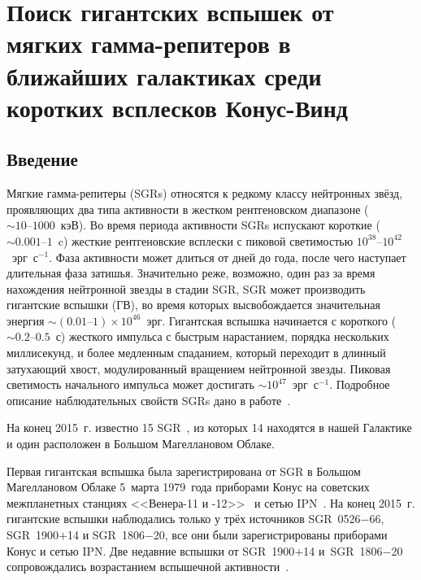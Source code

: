 \chapter{Поиск гигантских вспышек от мягких гамма-репитеров в ближайших галактиках 
         среди коротких всплесков Конус-Винд} \label{SGR_GF_search}

\section{Введение}
Мягкие гамма-репитеры (SGRs) относятся к редкому классу нейтронных звёзд, проявляющих 
два типа активности в жестком рентгеновском диапазоне ($\sim 10\textrm{--}1000$~кэВ). 
Во время периода активности SGRs испускают короткие ($\sim0.001\textrm{--}1$~c) жесткие рентгеновские всплески 
с пиковой светимостью $10^{38}\textrm{--}10^{42}$~эрг~с$^{-1}$. Фаза активности может длиться 
от дней до года, после чего наступает длительная фаза затишья. Значительно реже, 
возможно, один раз за время нахождения нейтронной звезды в стадии SGR, SGR может 
производить гигантские вспышки (ГВ), во время которых высвобождается значительная 
энергия $\sim(0.01\textrm{--}1)\times 10^{46}$~эрг. Гигантская вспышка начинается 
с короткого ($\sim 0.2\textrm{--}0.5$~с) жесткого импульса с быстрым нарастанием, 
порядка нескольких миллисекунд, и более медленным спаданием, который переходит 
в длинный затухающий хвост, модулированный вращением нейтронной звезды. 
Пиковая светимость начального импульса может достигать $\sim 10^{47}$~эрг~с$^{-1}$.
Подробное описание наблюдательных свойств SGRs дано в работе~\citep{Mereghetti2013}.

На конец 2015~г. известно 15 SGR~\citep{Olausen_Kaspi2014}, из которых 14 
находятся в нашей Галактике и один расположен в Большом Магеллановом Облаке. 

Первая гигантская вспышка была зарегистрирована от SGR в Большом Магеллановом Облаке 
5~марта 1979~года приборами Конус на советских межпланетных станциях 
<<Венера-11 и -12>>~\citep{Golenetskii1979SvAL, Mazets1979} 
и сетью IPN~\citep{Barat1979, Cline1980, Evans1980, Cline1982}. 
На конец 2015~г. гигантские вспышки наблюдались только у трёх источников 
SGR~0526$-$66, SGR~1900$+$14 и SGR~1806$-$20, все они были зарегистрированы 
приборами Конус и сетью IPN. Две недавние вспышки от SGR~1900$+$14 и~SGR~1806$-$20 
сопровождались возрастанием вспышечной активности~\citep{Mazets1999a, Frederiks2007}.

